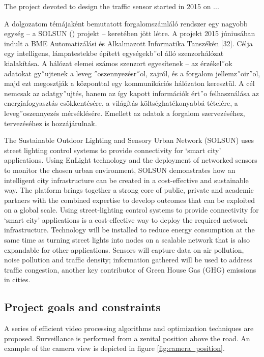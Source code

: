 The project devoted to design the traffic sensor started in 2015 on ...

A dolgozatom témájaként bemutatott forgalomszámláló rendszer egy nagyobb egység – a
SOLSUN () projekt – keretében jött
létre. A projekt 2015 júniusában indult a BME Automatizálási és Alkalmazott Informatika Tanszékén
[32]. Célja egy intelligens, lámpatestekbe épített egységekb˝ol álló szenzorhálózat kialakítása.
A hálózat elemei számos szenzort egyesítenek – az érzékel˝ok adatokat gy˝ujtenek a leveg
˝oszennyezésr˝ol, zajról, és a forgalom jellemz˝oir˝ol, majd ezt megosztják a központtal egy kommunikációs
hálózaton keresztül. A cél nemcsak az adatgy˝ujtés, hanem az így kapott információk
ért˝o felhasználása az energiafogyasztás csökkentésére, a világítás költséghatékonyabbá tételére,
a leveg˝oszennyezés mérséklésére. Emellett az adatok a forgalom szervezéséhez, tervezéséhez is
hozzájárulnak.

The Sustainable Outdoor Lighting and Sensory Urban Network (SOLSUN) uses street lighting control systems to provide connectivity for ‘smart city’ applications. Using EnLight technology and the deployment of networked sensors to monitor the chosen urban environment, SOLSUN demonstrates how an intelligent city infrastructure can be created in a cost-effective and sustainable way.
The platform brings together a strong core of public, private and academic partners with the combined expertise to develop outcomes that can be exploited on a global scale.
Using street-lighting control systems to provide connectivity for ‘smart city’ applications is a cost-effective way to deploy the required network infrastructure.
Technology will be installed to reduce energy consumption at the same time as turning street lights into nodes on a scalable network that is also expandable for other applications. Sensors will capture data on air pollution, noise pollution and traffic density; information gathered will be used to address traffic congestion, another key contributor of Green House Gas (GHG) emissions in cities.
\subsection{Project goals and constraints}
A series of efficient video processing algorithms and optimization techniques are proposed.
Surveillance is performed from a zenital position above the road.
An example of the camera view is depicted in figure \ref{fig:camera_position}.

